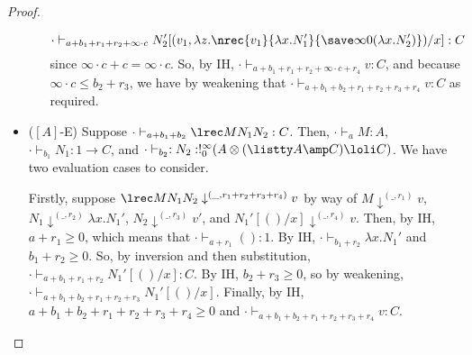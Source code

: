 \begin{proof}
\begin{itemize}
\begin{itemize}
  $$
  \cdot \vdash_{a+b_1+r_1+r_2 + \infty \cdot c} N_2'[(v_1,\lambda z.\nrec {v_1} {\lambda x.N_1'} {\save \infty 0 {(\lambda x.N_2')}})/x] : C  
  $$
  since $\infty \cdot c + c = \infty \cdot c$. So, by IH, $\cdot \vdash_{a+b_1 + r_1 + r_2 + \infty \cdot c + r_4} v : C$, and because $\infty \cdot c \leq b_2 + r_3$, we have by weakening that $\cdot \vdash_{a+b_1+b_2+r_1+r_2+r_3+r_4} v : C$ as required.
\end{itemize}
  
\item ($[A]$-E) Suppose $\cdot \vdash_{a + b_1 + b_2} \lrec M {N_1} {N_2} : C$. Then, $\cdot \vdash_a M : A$,  $\cdot \vdash_{b_1} N_1 : 1 \to C$, and $\cdot \vdash_{b_2} : N_2 : !^\infty_0(A \otimes (\listty A \amp C) \loli C)$. We have two evaluation cases to consider. 

Firstly, suppose $\lrec M {N_1} {N_2} \downarrow^{(\_,r_1+r_2+r_3+r_4)} v$ by way of $M \downarrow^{(\_,r_1)} v$, $N_1 \downarrow^{(\_,r_2)} \lambda x.N_1'$, $N_2 \downarrow^{(\_,r_3)} v'$, and $N_1'[()/x] \downarrow^{(\_,r_4)} v$. Then, by IH, $a + r_1 \geq 0$, which means that $\cdot \vdash_{a+r_1} () : 1$. By IH, $\cdot \vdash_{b_1 + r_2} \lambda x.N_1'$ and $b_1 + r_2 \geq 0$. So, by inversion and then substitution, $\cdot \vdash_{a+b_1+r_1+r_2} N_1'[()/x] : C$. By IH, $b_2 + r_3 \geq 0$, so by weakening, $\cdot \vdash_{a+b_1+b_2+r_1+r_2+r_3} N_1'[()/x]$. Finally, by IH, $a+b_1+b_2+r_1+r_2+r_3 + r_4 \geq 0$ and $\cdot \vdash_{a+b_1+b_2+r_1+r_2+r_3+r_4} v : C$.


\end{itemize}
\end{proof}
